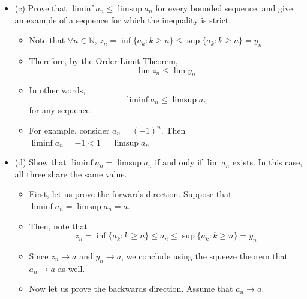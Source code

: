 \documentclass{article}
\begin{document}
\begin{itemize}
\begin{itemize}
        \[
        \limsup a_n = \lim y_n
        \]
        where $\lim y_n$ is the sequence from part (a) ofr this exercise. Provide a reasonable definition of lim inf and briefly explain why it always exists for any bounded sequence.
        \begin{itemize}
            \item We can define the sequence $z_n = \inf \{ a_k : k \ge n \}$. 
            \item Then, we can show similarly to the previous part that $z_n$ is monotone increasing and bounded above, which gives us convergence from the Monotone Convergence Theorem.
            \item We can then define
            \[
            \liminf a_n = \lim z_n
            \]
        \end{itemize}
        \item (c) Prove that $\liminf a_n \le \limsup a_n$ for every bounded sequence, and give an example of a sequence for which the inequality is strict.
        \begin{itemize}
            \item Note that $\forall n \in \mathbb{N}$, $z_n = \inf \{ a_k : k \ge n \} \le \sup \{ a_k : k \ge n \} = y_n$
            \item Therefore, by the Order Limit Theorem,
            \[
            \lim z_n \le \lim y_n
            \]
            \item In other words,
            \[
            \liminf a_n \le \limsup a_n
            \]
            for any sequence.
            \item For example, consider $a_n = (-1)^n$. Then $\liminf a_n = -1 < 1 = \limsup a_n$
        \end{itemize}
        \item (d) Show that $\liminf a_n = \limsup a_n$ if and only if $\lim a_n$ exists. In this case, all three share the same value.
        \begin{itemize}
            \item First, let us prove the forwards direction. Suppose that $\liminf a_n = \limsup a_n = a$.
            \item Then, note that
            \[
            z_n = \inf \{ a_k : k \ge n \} \le a_n \le \sup \{ a_k : k \ge n \} = y_n
            \]
            \item Since $z_n \rightarrow a$ and $y_n \rightarrow a$, we conclude using the squeeze theorem that $a_n \rightarrow a$ as well.
            \item Now let us prove the backwards direction. Assume that $a_n \rightarrow a$.

\end{itemize}
\end{itemize}
\end{itemize}
\end{document}
